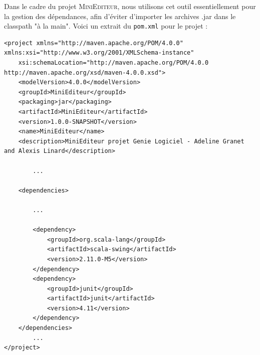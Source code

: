 \documentclass[a4paper,11pt]{article}
\begin{document}
Dans le cadre du projet \textsc{MiniEditeur}, nous utilisons cet outil essentiellement pour la gestion des dépendances, afin d'éviter d'importer les archives .jar dans le classpath "à la main". Voici un extrait du \texttt{pom.xml} pour le projet :
\begin{lstlisting}[caption=Exemple de fichier pom.xml, label=ruleml]
<project xmlns="http://maven.apache.org/POM/4.0.0" xmlns:xsi="http://www.w3.org/2001/XMLSchema-instance"
	xsi:schemaLocation="http://maven.apache.org/POM/4.0.0 http://maven.apache.org/xsd/maven-4.0.0.xsd">
	<modelVersion>4.0.0</modelVersion>
	<groupId>MiniEditeur</groupId>
	<packaging>jar</packaging>
	<artifactId>MiniEditeur</artifactId>
	<version>1.0.0-SNAPSHOT</version>
	<name>MiniEditeur</name>
	<description>MiniEditeur projet Genie Logiciel - Adeline Granet and Alexis Linard</description>
	
		...
	
	<dependencies>
	
		...
	
		<dependency>
			<groupId>org.scala-lang</groupId>
			<artifactId>scala-swing</artifactId>
			<version>2.11.0-M5</version>
		</dependency>
		<dependency>
			<groupId>junit</groupId>
			<artifactId>junit</artifactId>
			<version>4.11</version>
		</dependency>
	</dependencies>
		...
</project>
\end{lstlisting}
\end{document}
